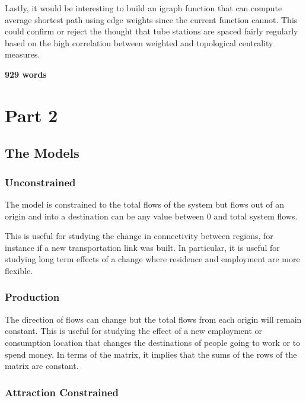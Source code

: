 \documentclass[11pt]{article} %
\begin{document}
Lastly, it would be interesting to build an igraph function that can compute average shortest path using edge weights since the current function cannot. This could confirm or reject the thought that tube stations are spaced fairly regularly based on the high correlation between weighted and topological centrality measures. 

\textbf{929 words}


\pagebreak

\section{Part 2}

\subsection{The Models}

\subsubsection{Unconstrained}

The model is constrained to the total flows of the system but flows out of an origin and into a destination can be any value between 0 and total system flows. 

This is useful for studying the change in connectivity between regions, for instance if a new transportation link was built. In particular, it is useful for studying long term effects of a change where residence and employment are more flexible. 

\subsubsection{Production}

The direction of flows can change but the total flows from each origin will remain constant. This is useful for studying the effect of a new employment or consumption location that changes the destinations of people going to work or to spend money. In terms of the matrix, it implies that the sums of the rows of the matrix are constant. 

\subsubsection{Attraction Constrained}
\end{document}
